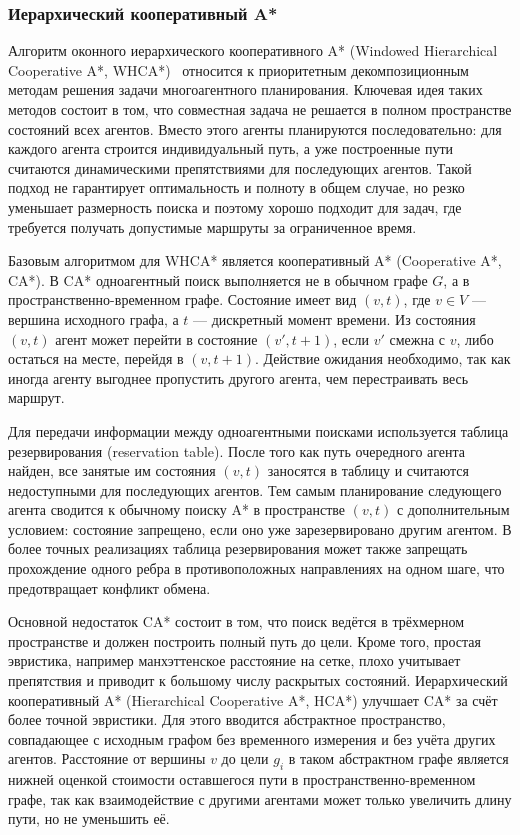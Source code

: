 \subsubsection{Иерархический кооперативный A*}

Алгоритм оконного иерархического кооперативного A* (Windowed Hierarchical Cooperative A*, WHCA*)~\cite{whca}
относится к приоритетным декомпозиционным методам решения задачи многоагентного планирования.
Ключевая идея таких методов состоит в том, что совместная задача не решается в полном пространстве
состояний всех агентов. Вместо этого агенты планируются последовательно: для каждого агента строится
индивидуальный путь, а уже построенные пути считаются динамическими препятствиями для последующих
агентов. Такой подход не гарантирует оптимальность и полноту в общем случае, но резко уменьшает
размерность поиска и поэтому хорошо подходит для задач, где требуется получать допустимые маршруты
за ограниченное время.

Базовым алгоритмом для WHCA* является кооперативный A* (Cooperative A*, CA*). В CA* одноагентный поиск выполняется
не в обычном графе $G$, а в пространственно-временном графе. Состояние имеет вид $(v, t)$, где
$v \in V$ --- вершина исходного графа, а $t$ --- дискретный момент времени. Из состояния $(v, t)$
агент может перейти в состояние $(v', t+1)$, если $v'$ смежна с $v$, либо остаться на месте, перейдя
в $(v, t+1)$. Действие ожидания необходимо, так как иногда агенту выгоднее пропустить другого агента,
чем перестраивать весь маршрут.

Для передачи информации между одноагентными поисками используется таблица резервирования
(reservation table). После того как путь очередного агента найден, все занятые им состояния
$(v, t)$ заносятся в таблицу и считаются недоступными для последующих агентов. Тем самым планирование
следующего агента сводится к обычному поиску A* в пространстве $(v, t)$ с дополнительным условием:
состояние запрещено, если оно уже зарезервировано другим агентом. В более точных реализациях таблица
резервирования может также запрещать прохождение одного ребра в противоположных направлениях на одном
шаге, что предотвращает конфликт обмена.

Основной недостаток CA* состоит в том, что поиск ведётся в трёхмерном пространстве и должен построить
полный путь до цели. Кроме того, простая эвристика, например манхэттенское расстояние на сетке, плохо
учитывает препятствия и приводит к большому числу раскрытых состояний. Иерархический кооперативный
A* (Hierarchical Cooperative A*, HCA*) улучшает CA* за счёт более точной эвристики. Для этого вводится
абстрактное пространство, совпадающее с исходным графом без временного измерения и без учёта других
агентов. Расстояние от вершины $v$ до цели $g_i$ в таком абстрактном графе является нижней оценкой
стоимости оставшегося пути в пространственно-временном графе, так как взаимодействие с другими
агентами может только увеличить длину пути, но не уменьшить её.

